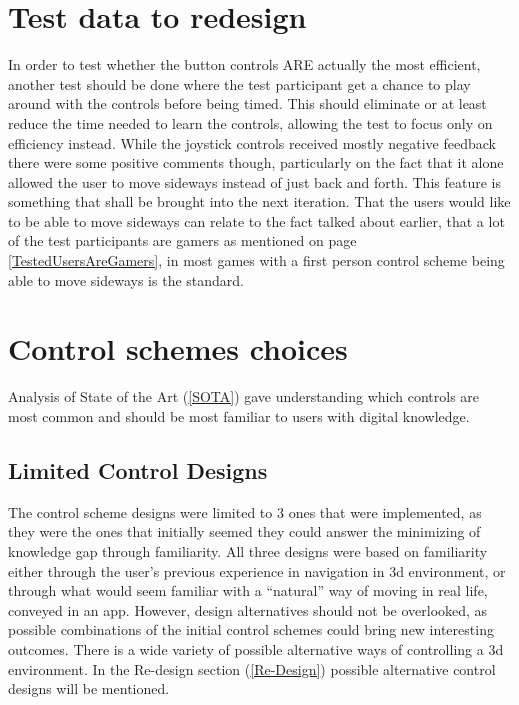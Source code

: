 \section*{Test data to redesign}
In order to test whether the button controls ARE actually the most efficient, another test should be done where the test participant get a chance to play around with the controls before being timed. This should eliminate or at least reduce the time needed to learn the controls, allowing the test to focus only on efficiency instead.
While the joystick controls received mostly negative feedback there were some positive comments though, particularly on the fact that it alone allowed the user to move sideways instead of just back and forth. This feature is something that shall be brought into the next iteration. That the users would like to be able to move sideways can relate to the fact talked about earlier, that a lot of the test participants are gamers as mentioned on page \ref{TestedUsersAreGamers}, in most games with a first person control scheme being able to move sideways is the standard. 

\section*{Control schemes choices}
Analysis of State of the Art (\ref{SOTA}) gave understanding which controls are most common and should be most familiar to users with digital knowledge.

\subsection*{Limited Control Designs} 

The control scheme designs were limited to 3 ones that were implemented, as they were the ones that initially seemed they could answer the minimizing of knowledge gap through familiarity. All three designs were based on familiarity either through the user's previous experience in navigation in 3d environment, or through what would seem familiar with a “natural” way of moving in real life, conveyed in an app.
However, design alternatives should not be overlooked, as possible combinations of the initial control schemes could bring new interesting outcomes. There is a wide variety of possible alternative ways of controlling a 3d environment. In the Re-design section (\ref{Re-Design}) possible alternative control designs will be mentioned.


